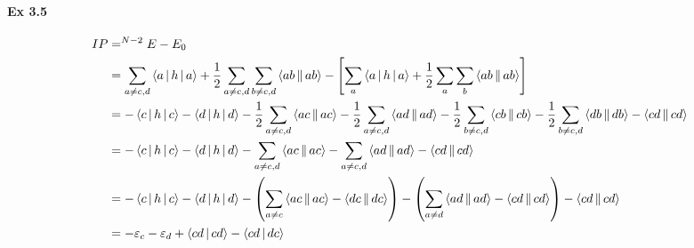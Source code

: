 \documentclass[a4paper]{article}
\newcommand{\ex}[1]{\paragraph{Ex #1}}
\numberwithin{equation}{subsection}
\begin{document}
\ex{3.5}
\begin{align}
IP &= ^{N-2}E - E_0 \notag\\
&= \sum_{a\neq c,d}\Braket{a|h|a} + \dfrac{1}{2}\sum_{a\neq c,d}\sum_{b\neq c,d} \Braket{ab||ab}  - \qty[\sum_a\Braket{a|h|a} + \dfrac{1}{2}\sum_a\sum_b \Braket{ab||ab} ] \notag\\
&= -\Braket{c|h|c} - \Braket{d|h|d} -  \dfrac{1}{2}\sum_{a\neq c,d}\Braket{ac||ac}  -  \dfrac{1}{2}\sum_{a\neq c,d}\Braket{ad||ad} - \dfrac{1}{2}\sum_{b\neq c,d} \Braket{cb||cb} - \dfrac{1}{2}\sum_{b\neq c,d} \Braket{db||db}  - \Braket{cd||cd} \notag\\
&= -\Braket{c|h|c} - \Braket{d|h|d} -  \sum_{a\neq c,d}\Braket{ac||ac}  -  \sum_{a\neq c,d}\Braket{ad||ad}   - \Braket{cd||cd} \notag\\
&= -\Braket{c|h|c} - \Braket{d|h|d} - \qty( \sum_{a\neq c}\Braket{ac||ac} - \Braket{dc||dc}) -  \qty(\sum_{a\neq d}\Braket{ad||ad} - \Braket{cd||cd})  - \Braket{cd||cd} \notag\\
&= -\varepsilon_c - \varepsilon_d + \Braket{cd|cd} - \Braket{cd|dc}
\end{align}
\end{document}
